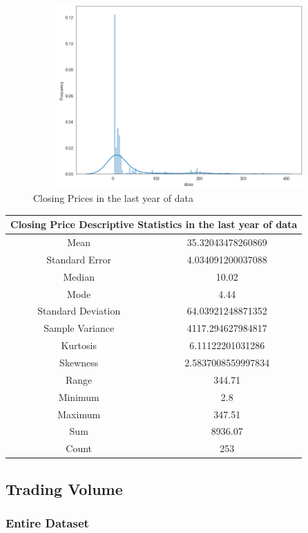 \begin{figure}[h!]
    \centering
    \includegraphics[width=15cm,height=7cm,keepaspectratio]{resultsEvaluation/closeDesc1.png}
    \caption{Closing Prices in the last year of data}
    \label{fig:appendix_closeDesc1}
\end{figure}
\begin{center}
\begin{tabular}{ c c }
\hline
\multicolumn{2}{|c|}{Closing Price Descriptive Statistics in the last year of data} \\
\hline
Mean & 35.32043478260869 \\
Standard Error & 4.034091200037088 \\
Median & 10.02 \\
Mode & 4.44 \\
Standard Deviation & 64.03921248871352 \\
Sample Variance & 4117.294627984817 \\
Kurtosis & 6.11122201031286 \\
Skewness & 2.5837008559997834 \\
Range & 344.71 \\
Minimum & 2.8 \\
Maximum & 347.51 \\
Sum & 8936.07 \\
Count & 253
\end{tabular}
\end{center}

\subsection{Trading Volume}

\subsubsection{Entire Dataset}

